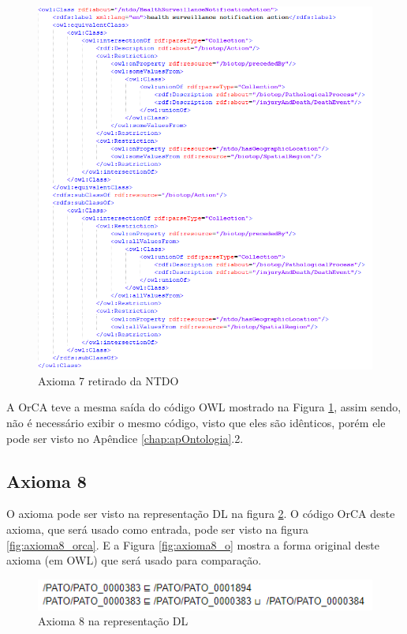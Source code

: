 \documentclass{bcc}
\begin{document}
\begin{figure}[H]
\centering
\includegraphics[width=1\textwidth]{Figuras/axioma7_o.png}
\caption{Axioma 7 retirado da NTDO} 
\label{fig:axioma7_o}
\end{figure}

A OrCA teve a mesma saída do código OWL mostrado na Figura \ref{fig:axioma7_o}, assim sendo, não é necessário exibir o mesmo código, visto que eles são idênticos, porém ele pode ser visto no Apêndice \ref{chap:apOntologia}.2.

\subsection{Axioma 8}
O axioma pode ser visto na representação DL na figura \ref{fig:axioma8_dl}. O código OrCA deste axioma, que será usado como entrada, pode ser visto na figura \ref{fig:axioma8_orca}. E a Figura \ref{fig:axioma8_o} mostra a forma original deste axioma (em OWL) que será usado para comparação. 

\begin{figure}[H]
\centering
\includegraphics[width=.6\textwidth]{Figuras/axioma8_dl.png}
\caption{Axioma 8 na representação DL} 
\label{fig:axioma8_dl}
\end{figure}
\end{document}
